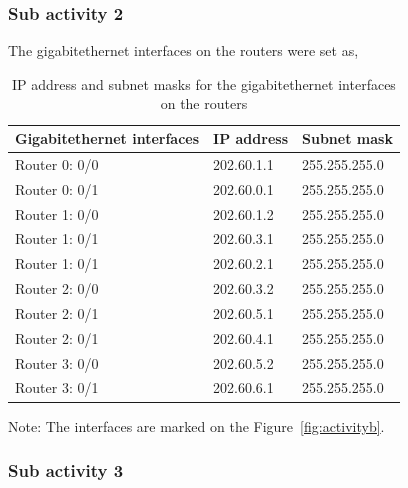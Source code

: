 \documentclass{lab_sheet}
\newcommand{\setting}[2]{
    \begin{tabular}{C{3cm}C{5cm}C{5cm}}
        \toprule
          #1 & IP address & Subnet mask\\
          \midrule
          #2
          \bottomrule
       \end{tabular}
}
\begin{document}
    \subsubsection*{Sub activity 2}

    The gigabitethernet interfaces on the routers were set as,
    \begin{table}[H]
        \centering
        \begin{threeparttable}
        \setting{Gigabitethernet interfaces}{
        Router 0: 0/0 & 202.60.1.1  & 255.255.255.0 \\
        Router 0: 0/1 & 202.60.0.1  & 255.255.255.0 \\
        Router 1: 0/0 & 202.60.1.2  & 255.255.255.0 \\
        Router 1: 0/1 & 202.60.3.1  & 255.255.255.0 \\
        Router 1: 0/1 & 202.60.2.1  & 255.255.255.0 \\
        Router 2: 0/0 & 202.60.3.2  & 255.255.255.0 \\
        Router 2: 0/1 & 202.60.5.1  & 255.255.255.0 \\
        Router 2: 0/1 & 202.60.4.1  & 255.255.255.0 \\
        Router 3: 0/0 & 202.60.5.2  & 255.255.255.0 \\
        Router 3: 0/1 & 202.60.6.1  & 255.255.255.0 \\
        }
        \begin{tablenotes}
            \small
            \item Note: The interfaces are marked on the Figure~\ref{fig:activityb}.
          \end{tablenotes}
        \caption{IP address and subnet masks for the gigabitethernet interfaces on the routers}
        \label{tbl:gigasettingb}
    \end{threeparttable}
          \end{table}

    \subsubsection*{Sub activity 3}
\end{document}
